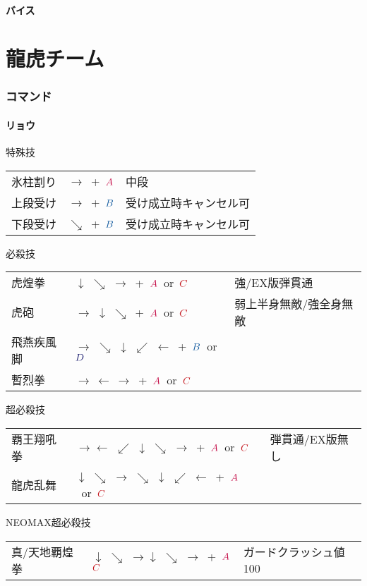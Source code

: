 \documentclass[a4j,11pt]{jarticle}
\def\A{$\textcolor{Acolor}{A}$}
\def\C{$\textcolor{Ccolor}{C}$}
\def\B{$\textcolor{Bcolor}{B}$}
\def\D{$\textcolor{Dcolor}{D}$}
\def\hado{$\downarrow$ $\searrow$ $\rightarrow$}%
\def\syoryu{$\rightarrow$ $\downarrow$ $\searrow$}%
\def\yoga{$\leftarrow$ $\swarrow$ $\downarrow$ $\searrow$ $\rightarrow$}%
\def\gyakuyoga{$\rightarrow$ $\searrow$ $\downarrow$ $\swarrow$ $\leftarrow$}%
\def\ryuko{$\downarrow$ $\searrow$ $\rightarrow$ $\searrow$ $\downarrow$ $\swarrow$ $\leftarrow$}%
\begin{document}
\subsection{バイス}
\newpage
\part{龍虎チーム}%
\section{コマンド}
\subsection{リョウ}
\begin{itembox}[l]{特殊技}
\begin{tabular}{lll}
氷柱割り&$\rightarrow$\ +\ \A&中段\\%
上段受け&$\rightarrow$\ +\ \B&受け成立時キャンセル可\\%
下段受け&$\searrow$\ +\ \B&受け成立時キャンセル可%
\end{tabular}
\end{itembox}
\begin{itembox}[l]{必殺技}
\begin{tabular}{lll}
虎煌拳&\hado\ +\ \A\ or\ \C&強/EX版弾貫通\\%
虎砲&\syoryu\ +\ \A\ or\ \C&弱上半身無敵/強全身無敵\\%
飛燕疾風脚&\gyakuyoga\ +\ \B\ or\ \D&\\%
暫烈拳&$\rightarrow\ \leftarrow\ \rightarrow$\ +\ \A\ or\ \C&%
\end{tabular}
\end{itembox}
\begin{itembox}[l]{超必殺技}
\begin{tabular}{lll}
覇王翔吼拳&$\rightarrow$\yoga\ +\ \A\ or\ \C&弾貫通/EX版無し\\%
龍虎乱舞&\ryuko\ +\ \A\ or\ \C&%
\end{tabular}
\end{itembox}
\begin{itembox}[l]{NEOMAX超必殺技}
\begin{tabular}{lll}
真/天地覇煌拳&\hado\hado\ +\ \A\C&ガードクラッシュ値100%
\end{tabular}
\end{itembox}
\newpage
\end{document}
